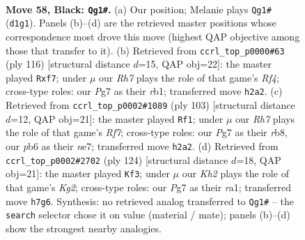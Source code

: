 \documentclass[11pt]{article}
\begin{document}
\clearpage

\begin{figure}[p]\centering
\begin{subfigure}{0.46\textwidth}\centering
\resizebox{\linewidth}{!}{%
\newchessgame
\chessboard[
  setfen={8/6pk/1P6/8/3ppP2/6K1/7r/3q4 b - - 6 58},
  showmover=false,
  pgfstyle=straightmove, color=movearrow, markmove={d1-g1}
]}
\caption{}
\end{subfigure}\hfill
\begin{subfigure}{0.46\textwidth}\centering
\resizebox{\linewidth}{!}{%
\newchessgame
\chessboard[
  setfen={8/5p2/7p/6k1/4PR2/8/5KP1/1r6 w - - 8 59},
  showmover=false,
  pgfstyle=straightmove, color=movearrow, markmove={f4-f7}
]}
\caption{}
\end{subfigure}
\\[4pt]
\begin{subfigure}{0.46\textwidth}\centering
\resizebox{\linewidth}{!}{%
\newchessgame
\chessboard[
  setfen={1R6/4N1k1/5p2/6pp/8/3PK3/5r2/8 b - - 5 52},
  showmover=false,
  pgfstyle=straightmove, color=movearrow, markmove={f2-f1}
]}
\caption{}
\end{subfigure}\hfill
\begin{subfigure}{0.46\textwidth}\centering
\resizebox{\linewidth}{!}{%
\newchessgame
\chessboard[
  setfen={8/4p3/4k3/5R2/p5P1/8/5PK1/r7 w - - 2 63},
  showmover=false,
  pgfstyle=straightmove, color=movearrow, markmove={g2-f3}
]}
\caption{}
\end{subfigure}
\caption{\textbf{Move 58, Black: \texttt{Qg1\#}.} (a) Our position; Melanie plays \texttt{Qg1\#} (\texttt{d1g1}). Panels (b)--(d) are the retrieved master positions whose correspondence most drove this move (highest QAP objective among those that transfer to it). (b) Retrieved from \texttt{ccrl\_top\_p0000\#63} (ply 116) [structural distance $d$=15, QAP obj=22]: the master played \texttt{Rxf7}; under $\mu$ our \emph{Rh7} plays the role of that game's \emph{Rf4}; cross-type roles: our \emph{P}g7 as their \emph{r}b1; transferred move \texttt{h2a2}. (c) Retrieved from \texttt{ccrl\_top\_p0002\#1089} (ply 103) [structural distance $d$=12, QAP obj=21]: the master played \texttt{Rf1}; under $\mu$ our \emph{Rh7} plays the role of that game's \emph{Rf7}; cross-type roles: our \emph{P}g7 as their \emph{r}b8, our \emph{p}b6 as their \emph{n}e7; transferred move \texttt{h2a2}. (d) Retrieved from \texttt{ccrl\_top\_p0002\#2702} (ply 124) [structural distance $d$=18, QAP obj=21]: the master played \texttt{Kf3}; under $\mu$ our \emph{Kh2} plays the role of that game's \emph{Kg2}; cross-type roles: our \emph{P}g7 as their \emph{r}a1; transferred move \texttt{h7g6}. Synthesis: no retrieved analog transferred to \texttt{Qg1\#} -- the \texttt{search} selector chose it on value (material / mate); panels (b)--(d) show the strongest nearby analogies.}
\label{fig:thought-m115}
\end{figure}
\end{document}
